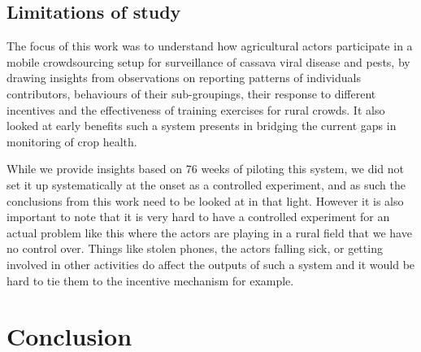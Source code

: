 \documentclass[letterpaper]{article} %
\begin{document}

\subsection{Limitations of study}
The focus of this work was to understand how agricultural actors participate in a mobile crowdsourcing setup for surveillance of cassava viral disease and pests, by drawing insights from observations on reporting patterns of individuals contributors, behaviours of  their sub-groupings, their response to different incentives and the effectiveness of training exercises for rural crowds. It also looked at early benefits such a system presents in bridging the current gaps in monitoring of crop health.

While we provide insights based on 76 weeks of piloting this system, we did not set it up systematically at the onset as a controlled experiment, and as such the conclusions from this work need to be looked at in that light. However it is also important to note that it is very hard to have a controlled experiment for an actual problem like this where the actors are playing in a rural field that we have no control over. Things like stolen phones, the actors falling sick, or getting involved in other activities do affect the outputs of such a system and it would be hard to tie them to the incentive mechanism for example.


\section{Conclusion}
\end{document}
